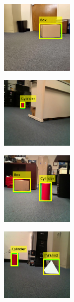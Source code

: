 \begin{figure}
    \centering
    \begin{subfigure}[]
        \centering
        \includegraphics[width=0.38\textwidth]{Images/tt1.png}
    \end{subfigure}
    \begin{subfigure}[]
        \centering
        \includegraphics[width=0.38\textwidth]{Images/tt2.png}
    \end{subfigure}
    \begin{subfigure}[]
        \centering
        \includegraphics[width=0.38\textwidth]{Images/tt3.png}
    \end{subfigure}
    \begin{subfigure}[]
        \centering
        \includegraphics[width=0.38\textwidth]{Images/tt4.png}

\end{subfigure}
\end{figure}

